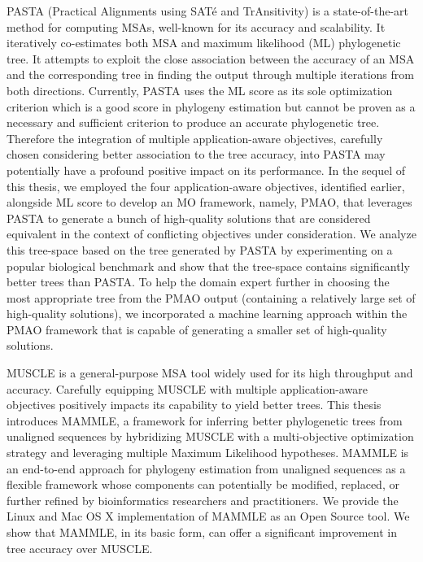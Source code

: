 PASTA (Practical Alignments using SAT\'e and TrAnsitivity) is a state-of-the-art method for computing MSAs, well-known for its accuracy and scalability. It iteratively co-estimates both MSA and maximum likelihood (ML) phylogenetic tree. It attempts to exploit the close association between the accuracy of an MSA and the corresponding tree in finding the output through multiple iterations from both directions. Currently, PASTA uses the ML score as its sole optimization criterion which is a good score in phylogeny estimation but cannot be proven as a necessary and sufficient criterion to produce an accurate phylogenetic tree. Therefore the integration of multiple application-aware objectives, carefully chosen considering better association to the tree accuracy, into PASTA may potentially have a profound positive impact on its performance. In the sequel of this thesis, we employed the four application-aware objectives, identified earlier, alongside ML score to develop an MO framework, namely, PMAO, that leverages PASTA to generate a bunch of high-quality solutions that are considered equivalent in the context of conflicting objectives under consideration. We analyze this tree-space based on the tree generated by PASTA by experimenting on a popular biological benchmark and show that the tree-space contains significantly better trees than PASTA. To help the domain expert further in choosing the most appropriate tree from the PMAO output (containing a relatively large set of high-quality solutions), we incorporated a machine learning approach within the PMAO framework that is capable of generating a smaller set of high-quality solutions. %

MUSCLE is a general-purpose MSA tool widely used for its high throughput and accuracy. Carefully equipping MUSCLE with multiple application-aware objectives positively impacts its capability to yield better trees. This thesis introduces MAMMLE, a framework for inferring better phylogenetic trees from unaligned sequences by hybridizing MUSCLE with a multi-objective optimization strategy and leveraging multiple Maximum Likelihood hypotheses. MAMMLE is an end-to-end approach for phylogeny estimation from unaligned sequences as a flexible framework whose components can potentially be modified, replaced, or further refined by bioinformatics researchers and practitioners. We provide the Linux and Mac OS X implementation of MAMMLE as an Open Source tool. We show that MAMMLE, in its basic form, can offer a significant improvement in tree accuracy over MUSCLE.

